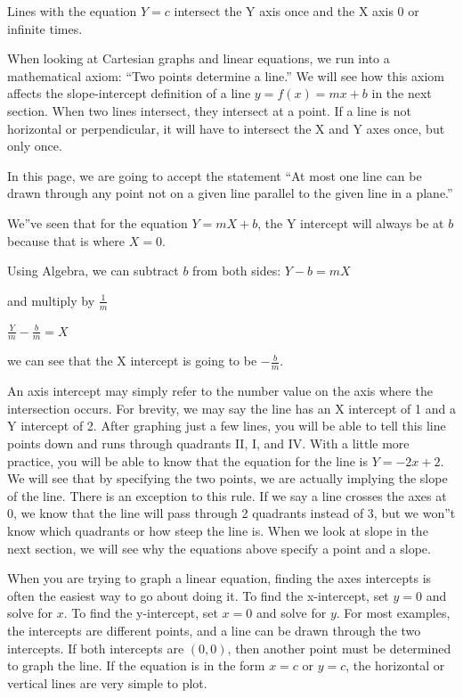 Lines with the equation $Y = c$ intersect the Y axis once and the X axis 0 or infinite times.

When looking at Cartesian graphs and linear equations, we run into a mathematical axiom: ``Two points determine a line.'' We will see how this axiom affects the slope-intercept definition of a line $y = f(x) = mx + b$ in the next section. When two lines intersect, they intersect at a point. If a line is not horizontal or perpendicular, it will have to intersect the X and Y axes once, but only once.

In this page, we are going to accept the statement ``At most one line can be drawn through
any point not on a given line parallel to the given line in a plane.''

We''ve seen that for the equation $Y = mX + b$, the Y intercept will always be at $b$ because that is where $X = 0$.

Using Algebra, we can subtract $b$ from both sides: $Y - b = mX$

and multiply by $\frac{1}{m}$

$\frac{Y}{m} - \frac{b}{m} = X$

we can see that the X intercept is going to be $-\frac{b}{m}$.

An axis intercept may simply refer to the number value on the axis where the intersection occurs. For brevity, we may say the line has an X intercept of 1 and a Y intercept of 2. After graphing just a few lines, you will be able to tell this line points down and runs through quadrants II, I, and IV. With a little more practice, you will be able to know that the equation for the line is $Y = -2x + 2$. We will see that by specifying the two points, we are actually implying the slope of the line. There is an exception to this rule. If we say a line crosses the axes at 0, we know that the line will pass through 2 quadrants instead of 3, but we won''t know which quadrants or how steep the line is. When we look at slope in the next section, we will see why the equations above specify a point and a slope.

When you are trying to graph a linear equation, finding the axes intercepts is often the easiest way to go about doing it. To find the x-intercept, set $y = 0$ and solve for $x$. To find the y-intercept, set $x = 0$ and solve for $y$. For most examples, the intercepts are different points, and a line can be drawn through the two intercepts. If both intercepts are $(0, 0)$, then another point must be determined to graph the line. If the equation is in the form $x = c$ or $y = c$, the horizontal or vertical lines are very simple to plot.

